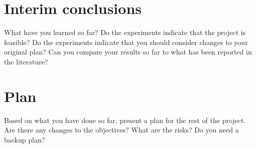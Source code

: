 \documentclass{article}
\begin{document}
\section{Interim conclusions}
\label{sec:concl}
What have you learned so far?  Do the experiments indicate that the project is feasible?  Do the experiments indicate that you should consider changes to your original plan?  Can you compare your results so far to what has been reported in the literature?

\section{Plan}
\label{sec:plan}
Based on what you have done so far, present a plan for the rest of the project.  Are there any changes to the objectives?  What are the risks?  Do you need a backup plan?


\end{document}
